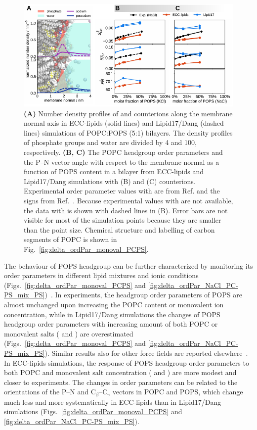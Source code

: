 \documentclass[journal=jctcce,manuscript=article]{achemso}
\newlength{\figwidth}
\newlength{\figwidthfull}
\begin{document}
\begin{figure}[!tbp] 
  \centering 
  \includegraphics[width=\figwidthfull]{../img/deltaOP_mix_PC-PS.pdf} 
  \caption{\label{fig:delta_ordPar_NaCl_PC-PS_mix_PC} 
    \textbf{(A)} Number density profiles of  and  counterions along the membrane normal axis
    in ECC-lipids (solid lines) and Lipid17/Dang (dashed lines) simulations of POPC:POPS (5:1) bilayers.  
    The density profiles of phosphate groups and water are divided by 4 and 100, respectively.  
    \textbf{(B, C)} The POPC headgroup order parameters and the P--N vector angle
    with respect to the membrane normal as a function of POPS content in a bilayer
    from ECC-lipids and Lipid17/Dang simulations with  (B) and  (C) counterions.
    Experimental order parameter values with  are from Ref. 
    and the signs from Ref.~. Because experimental values with  are
    not available, the data with  is shown with dashed lines in (B).
    Error bars are not visible for most of the simulation points because they are smaller than the point size.
    Chemical structure and labelling of carbon segments of POPC is shown in Fig.~\ref{fig:delta_ordPar_monoval_PCPS}. 
  }
\end{figure} 

The behaviour of POPS headgroup can be further characterized by monitoring its order parameters in different
lipid mixtures and ionic conditions (Figs.~\ref{fig:delta_ordPar_monoval_PCPS} and \ref{fig:delta_ordPar_NaCl_PC-PS_mix_PS})~\cite{NMRlipidsIV,roux90}.
In experiments, the headgroup order parameters of POPS are almost unchanged upon increasing the POPC content or monovalent ion concentration, 
while in Lipid17/Dang simulations the changes of POPS headgroup order parameters with increasing amount of
both POPC or monovalent salts ( and ) are overestimated 
(Figs.~\ref{fig:delta_ordPar_monoval_PCPS} and \ref{fig:delta_ordPar_NaCl_PC-PS_mix_PS}).
Similar results also for other force fields are reported elsewhere~\cite{NMRlipidsIV}.
In ECC-lipids simulations, the response of POPS headgroup order parameters to both POPC and monovalent salt concentration ( and )
are more modest and closer to experiments. 
The changes in order parameters can be related to the orientations of the P--N and C$_{\beta}$--C$_{\gamma}$
vectors in POPC and POPS, which change much less and more systematically in ECC-lipids
than in Lipid17/Dang simulations 
(Figs.~\ref{fig:delta_ordPar_monoval_PCPS} and \ref{fig:delta_ordPar_NaCl_PC-PS_mix_PS}).
\end{document}

